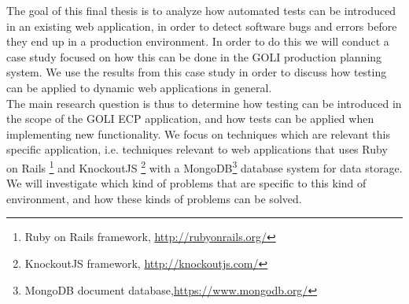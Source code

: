 
The goal of this final thesis is to analyze how automated tests can be
introduced in an existing web application, in order to detect software
bugs and errors before they end up in a production environment. In order
to do this we will conduct a case study focused on how this can be done
in the GOLI production planning system. We use the results from this
case study in order to discuss how testing can be applied to dynamic
web applications in general.\\

The main research question is thus to determine how testing can be
introduced in the scope of the GOLI ECP application, and how tests
can be applied when implementing new functionality. We focus on
techniques which are relevant this specific application, i.e.
techniques relevant to web applications that uses Ruby on Rails
\footnote{Ruby on Rails framework, \url{http://rubyonrails.org/}}
and KnockoutJS
\footnote{KnockoutJS framework, \url{http://knockoutjs.com/}} with a
MongoDB\footnote{MongoDB document database,\url{https://www.mongodb.org/}}
database system for data storage. We will investigate which kind of
problems that are specific to this kind of environment, and how these
kinds of problems can be solved.\\
